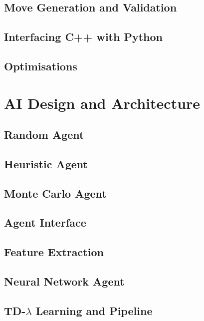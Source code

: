 \subsection{Move Generation and Validation}
\subsection{Interfacing C++ with Python}
\subsection{Optimisations}



\section{AI Design and Architecture}
\subsection{Random Agent}
\subsection{Heuristic Agent}
\subsection{Monte Carlo Agent}
\subsection{Agent Interface}
\subsection{Feature Extraction}
\subsection{Neural Network Agent}
\subsection{TD-$\lambda$ Learning and Pipeline}



